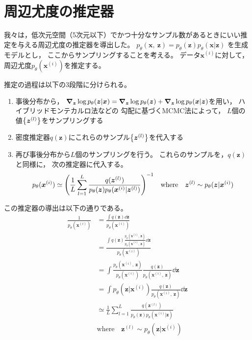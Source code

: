 \documentclass[dvipdfmx, fleqn]{jsarticle}
\begin{document}
\section{周辺尤度の推定器}

我々は，低次元空間（5次元以下）でかつ十分なサンプル数があるときにいい推定を与える周辺尤度の推定器を導出した。
\(p_{\theta} (\bm{x},\ \bm{z}) = p_{\theta} (\bm{z}) p_{\theta} (\bm{x} | \bm{z})\)
を生成モデルとし，
ここからサンプリングすることを考える。
データ\(\bm{x}^{(i)}\)に対して，
周辺尤度\(p_{\theta} (\bm{x}^{(i)})\)を推定する。

推定の過程は以下の3段階に分けられる。

\begin{enumerate}
    \item
        事後分布から，
        \(\grad_{\bm{z}} \log{p_{\theta} (\bm{z} | \bm{x})} = \grad_{\bm{z}} \log{p_{\theta} (\bm{z})} + \grad_{\bm{z}} \log{p_{\theta} (\bm{x} | \bm{z})}\)を用い，
        ハイブリッドモンテカルロ法などの
        勾配に基づくMCMC法によって，
        \(L\)個の値\(\qty{\bm{z}^{(l)}}\)をサンプリングする
    \item
        密度推定器\(q(\bm{z})\)にこれらのサンプル\(\qty{\bm{z}^{(l)}}\)を代入する
    \item
        再び事後分布から\(L\)個のサンプリングを行う。
        これらのサンプルを，\(q(\bm{z})\)と同様に，
        次の推定器に代入する。
        \begin{equation*}
            p_{\theta} (\bm{x}^{(i)}) \simeq \qty(\frac{1}{L} \sum_{l=1}^{L} \frac{q(\bm{z}^{(l)})}{p_{\theta} (\bm{z}) p_{\theta} (\bm{x}^{(i)} | \bm{z}^{(l)})})^{-1}
            \quad \text{where} \quad
            \bm{z}^{(l)} \sim p_{\theta} (\bm{z} | \bm{x}^{(i)})
        \end{equation*}
\end{enumerate}
この推定器の導出は以下の通りである。
\begin{align*}
    \frac{1}{p_{\theta} (\bm{x}^{(i)})}
        & = \frac{\int q(\bm{z}) \dd{\bm{z}}}{p_{\theta} (\bm{x}^{(i)})} \\
        & = \frac{\int q(\bm{z}) \frac{p_{\theta} (\bm{x}^{(i)},\ \bm{z})}{p_{\theta} (\bm{x}^{(i)},\ \bm{z})} \dd{\bm{z}}}{p_{\theta} (\bm{x}^{(i)})} \\
        & = \int \frac{p_{\theta} (\bm{x}^{(i)},\ \bm{z})}{p_{\theta} (\bm{x}^{(i)})} \frac{q(\bm{z})}{p_{\theta} (\bm{x}^{(i)},\ \bm{z})} \dd{\bm{z}} \\
        & = \int p_{\theta} (\bm{z} | \bm{x}^{(i)}) \frac{q(\bm{z})}{p_{\theta} (\bm{x}^{(i)},\ \bm{z})} \dd{\bm{z}} \\
        & \simeq \frac{1}{L} \sum_{l=1}^{L} \frac{q(\bm{z}^{(l)})}{p_{\theta} (\bm{z}) p_{\theta} (\bm{x}^{(i)} | \bm{z})} \\
        & \text{where} \quad \bm{z}^{(l)} \sim p_{\theta} (\bm{z} | \bm{x}^{(i)})
\end{align*}
\end{document}
